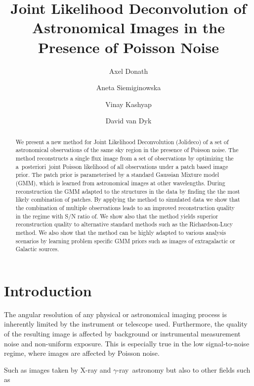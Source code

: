 \documentclass[twocolumn]{aastex631}
\newcommand{\aposteriori}{a~posteriori~}
\newcommand{\gammaray}{$\gamma$-ray\xspace}
\newcommand{\xray}{X-ray\xspace}
\begin{document}
    \title{Joint Likelihood Deconvolution of Astronomical Images in the Presence of Poisson Noise}

    \author[0000-0003-4568-7005]{Axel Donath}
    \author[0000-0002-0905-7375]{Aneta Siemiginowska}
    \author[0000-0002-3869-7996]{Vinay Kashyap}
    \author[0000-0000-0000-0000]{David van Dyk}


    \begin{abstract}
        We present a new method for Joint Likelihood Deconvolution (Jolideco) of a set of astronomical observations of the same sky region in the presence of Poisson noise.
        The method reconstructs a single flux image from a set of observations
        by optimizing the \aposteriori joint Poisson likelihood of all
        observations under a patch based image prior. The patch
        prior is parameterised by a standard Gaussian Mixture model (GMM), which is
        learned from astronomical images at other wavelengths.
        During reconstruction the GMM adapted to the structures
        in the data by finding the the most likely combination of 
        patches. 
        By applying the method to simulated data we show that
        the combination of multiple observations leads to an
        improved reconstruction quality in the regime with S/N ratio of.
        We show also that the method yields superior reconstruction quality
        to alternative standard methods such as the Richardson-Lucy method.
        We also show that the method can be highly adapted to various 
        analysis scenarios by learning problem specific GMM priors
        such as images of extragalactic or Galactic sources.
    \end{abstract}



    \section{Introduction}
    The angular resolution of any physical or astronomical imaging process is inherently limited by the instrument or telescope used.
    Furthermore, the quality of the resulting image is affected by background or instrumental measurement noise and non-uniform exposure. This is especially true in the low signal-to-noise regime, where images are affected by Poisson noise.
    
    Such as images taken by \xray and \gammaray~astronomy but also to other fields such as 
\end{document}
